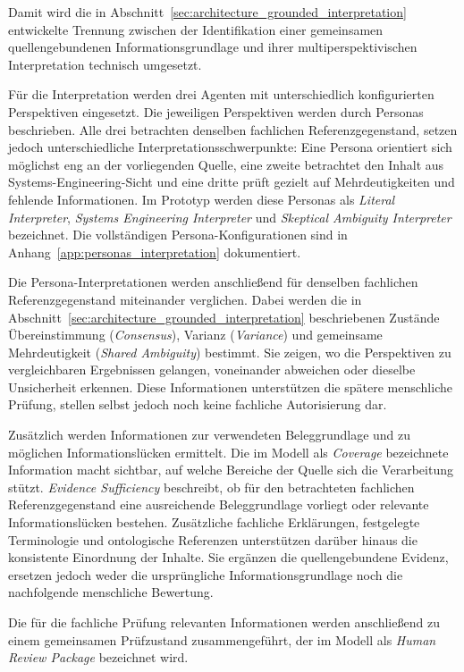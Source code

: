 Damit wird die in
Abschnitt~\ref{sec:architecture_grounded_interpretation} entwickelte
Trennung zwischen der Identifikation einer gemeinsamen quellengebundenen
Informationsgrundlage und ihrer multiperspektivischen Interpretation
technisch umgesetzt.

Für die Interpretation werden drei Agenten mit unterschiedlich
konfigurierten Perspektiven eingesetzt. Die jeweiligen Perspektiven werden
durch Personas beschrieben. Alle drei betrachten denselben fachlichen
Referenzgegenstand, setzen jedoch unterschiedliche
Interpretationsschwerpunkte: Eine Persona orientiert sich möglichst eng an
der vorliegenden Quelle, eine zweite betrachtet den Inhalt aus
Systems-Engineering-Sicht und eine dritte prüft gezielt auf Mehrdeutigkeiten
und fehlende Informationen. Im Prototyp werden diese Personas als
\emph{Literal Interpreter}, \emph{Systems Engineering Interpreter} und
\emph{Skeptical Ambiguity Interpreter} bezeichnet. Die vollständigen
Persona-Konfigurationen sind in
Anhang~\ref{app:personas_interpretation} dokumentiert.

Die Persona-Interpretationen werden anschließend für denselben fachlichen
Referenzgegenstand miteinander verglichen. Dabei werden die in
Abschnitt~\ref{sec:architecture_grounded_interpretation} beschriebenen
Zustände Übereinstimmung (\emph{Consensus}), Varianz (\emph{Variance}) und
gemeinsame Mehrdeutigkeit (\emph{Shared Ambiguity}) bestimmt. Sie zeigen, wo
die Perspektiven zu vergleichbaren Ergebnissen gelangen, voneinander
abweichen oder dieselbe Unsicherheit erkennen. Diese Informationen
unterstützen die spätere menschliche Prüfung, stellen selbst jedoch noch
keine fachliche Autorisierung dar.

Zusätzlich werden Informationen zur verwendeten Beleggrundlage und zu
möglichen Informationslücken ermittelt. Die im Modell als
\emph{Coverage} bezeichnete Information macht sichtbar, auf welche Bereiche
der Quelle sich die Verarbeitung stützt. \emph{Evidence Sufficiency}
beschreibt, ob für den betrachteten fachlichen Referenzgegenstand eine
ausreichende Beleggrundlage vorliegt oder relevante Informationslücken
bestehen. Zusätzliche fachliche Erklärungen, festgelegte Terminologie und
ontologische Referenzen unterstützen darüber hinaus die konsistente
Einordnung der Inhalte. Sie ergänzen die quellengebundene Evidenz, ersetzen
jedoch weder die ursprüngliche Informationsgrundlage noch die nachfolgende
menschliche Bewertung.

Die für die fachliche Prüfung relevanten Informationen werden anschließend
zu einem gemeinsamen Prüfzustand zusammengeführt, der im Modell als
\emph{Human Review Package} bezeichnet wird. 

